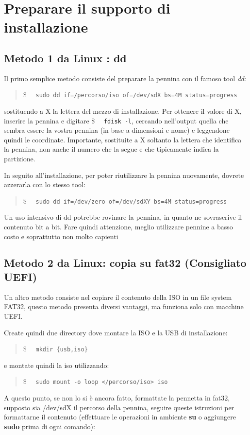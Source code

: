 \documentclass[twoside,italian]{book}
\newcommand{\shellcode}[1]{\$$\quad$ \texttt{#1}}
\newcommand{\centcode}[1]{
	\begin{quote}
		\color{code}
		\shellcode{#1}
	\end{quote}
}
\begin{document}
    
	\cleardoublepage

	\tableofcontents

\chapter {Preparare il supporto di installazione }

\section{Metodo 1 da Linux : dd}

    Il primo semplice metodo consiste del preparare la pennina con il famoso tool \textit{dd}:
    \centcode{sudo dd if=/percorso/iso of=/dev/sdX bs=4M status=progress}

    sostituendo a X la lettera del mezzo di installazione. Per ottenere il valore di X, inserire la pennina e digitare \shellcode{fdisk -l}, cercando nell'output quella che sembra essere la vostra pennina (in base a dimensioni e nome) e leggendone quindi le coordinate. 
    Importante, sostituite a X soltanto la lettera che identifica la pennina, non anche il numero che la segue e che tipicamente indica la partizione.

    In seguito all'installazione, per poter riutilizzare la pennina nuovamente, dovrete azzerarla con lo stesso tool:
    \centcode{sudo dd if=/dev/zero of=/dev/sdXY bs=4M status=progress}

    \begin{tcolorbox}[floatplacement=b,width=\textwidth,colback={blue},title={NOTA BENE:},colbacktitle=gray,coltitle=white,colupper=white]
        Un uso intensivo di dd potrebbe rovinare la pennina, in quanto ne sovrascrive il contenuto bit a bit. Fare quindi attenzione, meglio utilizzare pennine a basso costo e soprattutto non molto capienti
    \end{tcolorbox}

\section{Metodo 2  da Linux:  copia su fat32 (Consigliato UEFI)}
    Un altro metodo consiste nel copiare il contenuto della ISO in un file system FAT32, questo metodo presenta diversi vantaggi, ma funziona solo con macchine UEFI.

    Create quindi due directory dove montare la ISO e la USB di installazione:
    \centcode{mkdir \{usb,iso\}}
    e montate quindi la iso utilizzando: 
    \centcode{sudo mount -o loop </percorso/iso> iso}
    A questo punto, se non lo si è ancora fatto, formattate la pennetta in fat32, supposto sia /dev/sdX il percorso della pennina, seguire queste istruzioni per formattarne il contenuto (effettuare le operazioni in ambiente \textbf{su} o aggiungere \textbf{sudo} prima di ogni comando):
\end{document}
